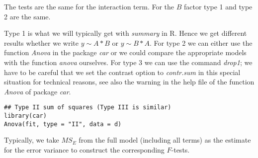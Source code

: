 The tests are the same for the interaction term. For the $B$ factor type 1 and type 2 are the same. \medskip

Type 1 is what we will typically get with \textit{summary} in R. Hence we get different results whether we write $y \sim A * B$ or $y \sim B * A$. For type 2 we can either use the function \textit{Anova} in the package \textit{car} or we could compare the appropriate models with the function \textit{anova} ourselves. For type 3 we can use the command \textit{drop1}; we have to be careful that we set the contrast option to \textit{contr.sum} in this special situation for technical reasons, see also the warning in the help file of the function \textit{Anova} of package \textit{car}.

\begin{lstlisting}
## Type II sum of squares (Type III is similar)
library(car)
Anova(fit, type = "II", data = d)	
\end{lstlisting}

Typically, we take $MS_E$ from the full model (including all terms) as the estimate for the error variance to construct the corresponding $F$-tests.
